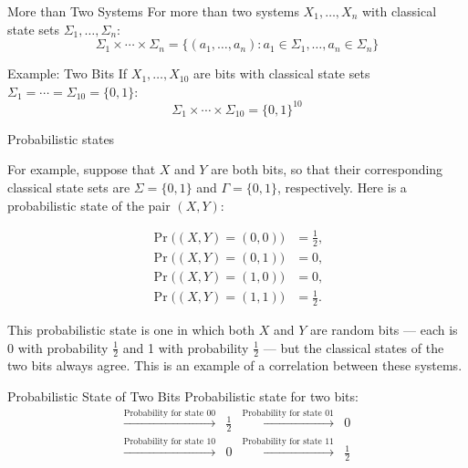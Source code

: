 \documentclass[12pt, aspectratio=169]{beamer}
\begin{document}
\begin{frame}{More than Two Systems}
    For more than two systems \(X_1, \ldots, X_n\) with classical state sets \(\Sigma_1, \ldots, \Sigma_n\):
    \[
    \Sigma_1 \times \cdots \times \Sigma_n = \{(a_1, \ldots, a_n) : a_1 \in \Sigma_1, \ldots, a_n \in \Sigma_n\}
    \]
\end{frame}

\begin{frame}{Example: Two Bits}
    If \(X_1, \ldots, X_{10}\) are bits with classical state sets \(\Sigma_1 = \cdots = \Sigma_{10} = \{0, 1\}\):
    \[
    \Sigma_1 \times \cdots \times \Sigma_{10} = \{0, 1\}^{10}
    \]
\end{frame}
\begin{frame}{Probabilistic states}

For example, suppose that \(X\) and \(Y\) are both bits, so that their corresponding classical state sets are \(\Sigma = \{0,1\}\) and \(\Gamma = \{0,1\}\), respectively. Here is a probabilistic state of the pair \((X,Y)\):

\[
\begin{aligned}
    \operatorname{Pr}\bigl( (X,Y) = (0,0)\bigr) & = \frac{1}{2}, \\
    \operatorname{Pr}\bigl( (X,Y) = (0,1)\bigr) & = 0, \\
    \operatorname{Pr}\bigl( (X,Y) = (1,0)\bigr) & = 0, \\
    \operatorname{Pr}\bigl( (X,Y) = (1,1)\bigr) & = \frac{1}{2}.
\end{aligned}
\]

This probabilistic state is one in which both \(X\) and \(Y\) are random bits — each is 0 with probability \(\frac{1}{2}\) and 1 with probability \(\frac{1}{2}\) — but the classical states of the two bits always agree. This is an example of a correlation between these systems.



\end{frame}
\begin{frame}{Probabilistic State of Two Bits}
    Probabilistic state for two bits:
    \[
    \begin{array}{cccc}
        \xrightarrow{\text{Probability for state 00}} & \frac{1}{2} & \xrightarrow{\text{Probability for state 01}} & 0 \\
        \xrightarrow{\text{Probability for state 10}} & 0 & \xrightarrow{\text{Probability for state 11}} & \frac{1}{2}
    \end{array}
    \]
\end{frame}
\end{document}
